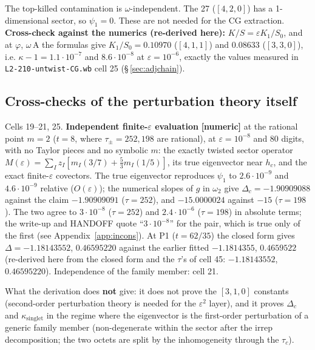 \documentclass[10pt]{article}
\newcommand{\nb}[1]{\texttt{#1}}
\begin{document}
The top-killed contamination is $\omega$-independent. The 27 ($[4,2,0]$) has a 1-dimensional sector, so $\psi_1=0$. These are not needed for the CG extraction. \textbf{Cross-check against the numerics (re-derived here):} $K/S=\varepsilon K_1/S_0$, and at $\varphi$, $\omega\,\mathrm{A}$ the formulas give $K_1/S_0=0.10970$ ($[4,1,1]$) and $0.08633$ ($[3,3,0]$), i.e. $\kappa-1=1.1\cdot10^{-7}$ and $8.6\cdot10^{-8}$ at $\varepsilon=10^{-6}$, exactly the values measured in \nb{L2-\allowbreak{}210-\allowbreak{}untwist-\allowbreak{}CG.\allowbreak{}wb} cell 25 (\S\,\ref{sec:adjchain}).

\subsection{Cross-checks of the perturbation theory itself}\label{sec:pertcheck}

Cells 19--21, 25. \textbf{Independent finite-$\varepsilon$ evaluation} \textbf{[numeric]} at the rational point $m=2$ ($t=8$, where $\tau_\pm=252,198$ are rational), at $\varepsilon=10^{-8}$ and 80 digits, with no Taylor pieces and no symbolic $m$: the exactly twisted sector operator $M(\varepsilon)=\sum_Iz_I[m_I(3/7)+\tfrac53m_I(1/5)]$, its true eigenvector near $h_c$, and the exact finite-$\varepsilon$ covectors. The true eigenvector reproduces $\psi_1$ to $2.6\cdot10^{-9}$ and $4.6\cdot10^{-9}$ relative ($O(\varepsilon)$); the numerical slopes of $g$ in $\omega_2$ give $\Delta_c=-1.90909088$ against the claim $-1.90909091$ ($\tau=252$), and $-15.0000024$ against $-15$ ($\tau=198$). The two agree to $3\cdot10^{-8}$ ($\tau=252$) and $2.4\cdot10^{-6}$ ($\tau=198$) in absolute terms; the write-up and HANDOFF quote ``$3\cdot10^{-8}$'' for the pair, which is true only of the first (see Appendix~\ref{app:incons}). At P1 ($t=62/35$) the closed form gives $\Delta=-1.18143552$, $0.46595220$ against the earlier fitted $-1.1814355$, $0.4659522$ (re-derived here from the closed form and the $\tau$'s of cell 45: $-1.18143552$, $0.46595220$). Independence of the family member: cell 21.

What the derivation does \textbf{not} give: it does not prove the $[3,1,0]$ constants (second-order perturbation theory is needed for the $\varepsilon^2$ layer), and it proves $\Delta_c$ and $\kappa_{\mathrm{singlet}}$ in the regime where the eigenvector is the first-order perturbation of a generic family member (non-degenerate within the sector after the irrep decomposition; the two octets are split by the inhomogeneity through the $\tau_c$).
\end{document}
